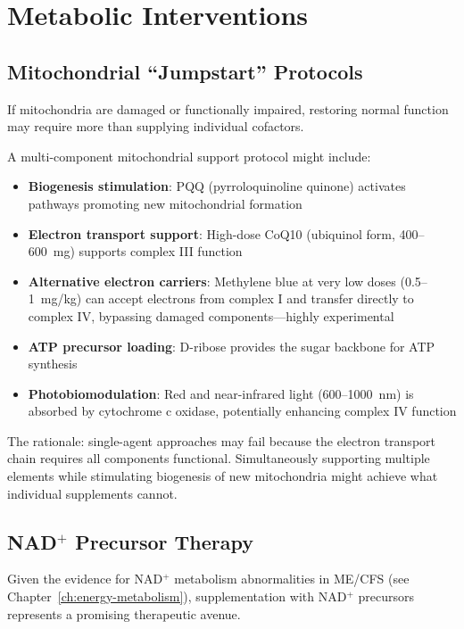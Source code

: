 \section{Metabolic Interventions}
\label{sec:metabolic-interventions}

\subsection{Mitochondrial ``Jumpstart'' Protocols}

If mitochondria are damaged or functionally impaired, restoring normal function may require more than supplying individual cofactors.

\begin{speculation}
A multi-component mitochondrial support protocol might include:
\begin{itemize}
    \item \textbf{Biogenesis stimulation}: PQQ (pyrroloquinoline quinone) activates pathways promoting new mitochondrial formation
    \item \textbf{Electron transport support}: High-dose CoQ10 (ubiquinol form, 400--600~mg) supports complex III function
    \item \textbf{Alternative electron carriers}: Methylene blue at very low doses (0.5--1~mg/kg) can accept electrons from complex I and transfer directly to complex IV, bypassing damaged components---highly experimental
    \item \textbf{ATP precursor loading}: D-ribose provides the sugar backbone for ATP synthesis
    \item \textbf{Photobiomodulation}: Red and near-infrared light (600--1000~nm) is absorbed by cytochrome c oxidase, potentially enhancing complex IV function
\end{itemize}
The rationale: single-agent approaches may fail because the electron transport chain requires all components functional. Simultaneously supporting multiple elements while stimulating biogenesis of new mitochondria might achieve what individual supplements cannot.
\end{speculation}

\subsection{NAD$^+$ Precursor Therapy}

Given the evidence for NAD$^+$ metabolism abnormalities in ME/CFS (see Chapter~\ref{ch:energy-metabolism}), supplementation with NAD$^+$ precursors represents a promising therapeutic avenue.

